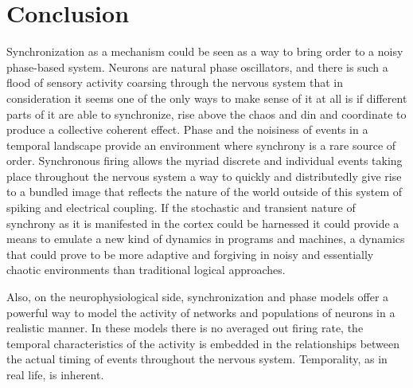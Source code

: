 \documentclass[12pt]{article}
\begin{document}
\section{Conclusion}

Synchronization as a mechanism could be seen as a way to bring order to a noisy phase-based system.  Neurons are natural phase oscillators, and there is such a flood of sensory activity coarsing through the nervous system that in consideration it seems one of the only ways to make sense of it at all is if different parts of it are able to synchronize, rise above the chaos and din and coordinate to produce a collective coherent effect.  Phase and the noisiness of events in a temporal landscape provide an environment where synchrony is a rare source of order.  Synchronous firing allows the myriad discrete and individual events taking place throughout the nervous system a way to quickly and distributedly give rise to a bundled image that reflects the nature of the world outside of this system of spiking and electrical coupling.  If the stochastic and transient nature of synchrony as it is manifested in the cortex could be harnessed it could provide a means to emulate a new kind of dynamics in programs and machines, a dynamics that could prove to be more adaptive and forgiving in noisy and essentially chaotic environments than traditional logical approaches.

Also, on the neurophysiological side, synchronization and phase models offer a powerful way to model the activity of networks and populations of neurons in a realistic manner.  In these models there is no averaged out firing rate, the temporal characteristics of the activity is embedded in the relationships between the actual timing of events throughout the nervous system.  Temporality, as in real life, is inherent. 



\end{document}
